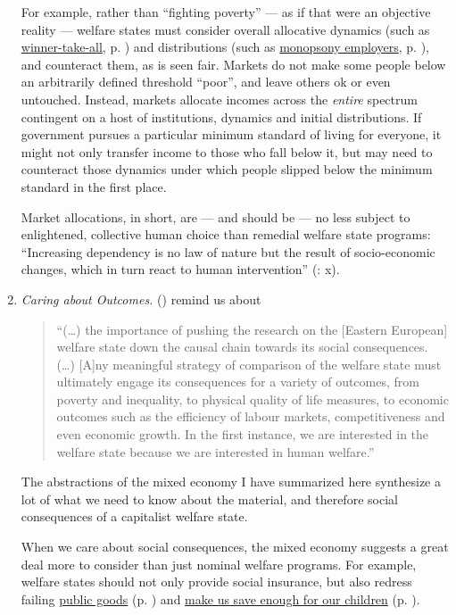\begin{enumerate}
	For example, rather than ``fighting poverty'' --- as if that were an objective reality --- welfare states must consider overall allocative dynamics (such as \hyperref[sec:winner-take-all]{winner-take-all}, p. \pageref{sec:winner-take-all}) and distributions (such as \hyperref[sec:monopsony_employers]{monopsony employers}, p. \pageref{sec:monopsony_employers}), and counteract them, as is seen fair. Markets do not make some people below an arbitrarily defined threshold ``poor'', and leave others ok or even untouched. Instead, markets allocate incomes across the \emph{entire} spectrum contingent on a host of institutions, dynamics and initial distributions. If government pursues a particular minimum standard of living for everyone, it might not only transfer income to those who fall below it, but may need to counteract those dynamics under which people slipped below the minimum standard in the first place. 
	
	Market allocations, in short, are --- and should be --- no less subject to enlightened, collective human choice than remedial welfare state programs: ``Increasing dependency is no law of nature but the result of socio-economic changes, which in turn react to human intervention'' (\citealt{Esping-Andersen2002}: x).
	
	\item \emph{Caring about Outcomes.} \citeauthor{Haggard2009} (\citeyear[236]{Haggard2009}) remind us about
		\begin{quote}
			``(\ldots) the importance of pushing the research on the [Eastern European] welfare state down the causal chain towards its social consequences. (\ldots) [A]ny meaningful strategy of comparison of the welfare state must ultimately engage its consequences for a variety of outcomes, from poverty and inequality, to physical quality of life measures, to economic outcomes such as the efficiency of labour markets, competitiveness and even economic growth. In the first instance, we are interested in the welfare state because we are interested in human welfare.''
		\end{quote}
	
	The abstractions of the mixed economy I have summarized here synthesize a lot of what we need to know about the material, and therefore social consequences of a capitalist welfare state. 

	When we care about social consequences, the mixed economy suggests a great deal more to consider than just nominal welfare programs. For example, welfare states should not only provide social insurance, but also redress failing \hyperref[sec:public_good]{public goods} (p. \pageref{sec:public_good}) and \hyperref[sec:long-term_inconsistency]{make us save enough for our children} (p. \pageref{sec:long-term_inconsistency}). 
	

\end{enumerate}
